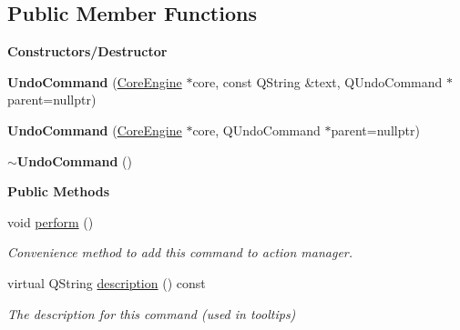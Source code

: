 \subsection*{Public Member Functions}
\begin{Indent}\textbf{ Constructors/\+Destructor}\par
\begin{DoxyCompactItemize}
\item 
\mbox{\label{classrev_1_1_undo_command_aef51dfefc4c575f3fd952f8b909fc456}} 
{\bfseries Undo\+Command} (\mbox{\hyperlink{classrev_1_1_core_engine}{Core\+Engine}} $\ast$core, const Q\+String \&text, Q\+Undo\+Command $\ast$parent=nullptr)
\item 
\mbox{\label{classrev_1_1_undo_command_aaf8d6c99f3c116faa667ce4f03f65f5c}} 
{\bfseries Undo\+Command} (\mbox{\hyperlink{classrev_1_1_core_engine}{Core\+Engine}} $\ast$core, Q\+Undo\+Command $\ast$parent=nullptr)
\item 
\mbox{\label{classrev_1_1_undo_command_a3f6a61d1bacf7290d0971f45bd1eddb3}} 
{\bfseries $\sim$\+Undo\+Command} ()
\end{DoxyCompactItemize}
\end{Indent}
\begin{Indent}\textbf{ Public Methods}\par
\begin{DoxyCompactItemize}
\item 
\mbox{\label{classrev_1_1_undo_command_a821d52d8654ff0dd5d49d6f26e746574}} 
void \mbox{\hyperlink{classrev_1_1_undo_command_a821d52d8654ff0dd5d49d6f26e746574}{perform}} ()
\begin{DoxyCompactList}\small\item\em Convenience method to add this command to action manager. \end{DoxyCompactList}\item 
\mbox{\label{classrev_1_1_undo_command_a54463306d1fa3a9540b67c6064d45b4f}} 
virtual Q\+String \mbox{\hyperlink{classrev_1_1_undo_command_a54463306d1fa3a9540b67c6064d45b4f}{description}} () const
\begin{DoxyCompactList}\small\item\em The description for this command (used in tooltips) \end{DoxyCompactList}\end{DoxyCompactItemize}
\end{Indent}
